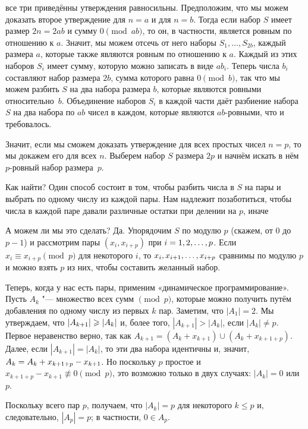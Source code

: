 \documentclass[twoside]{book}
\begin{document}
 все три приведённы утверждения равносильны.
Предположим, что мы можем доказать второе утверждение для $n = a$ и для $n = b$.
Тогда если набор $S$ имеет размер $2n = 2ab$ и сумму $0 \pmod {ab}$, то он, в частности, является ровным по отношению к $a$. 
Значит, мы можем отсечь от него наборы $S_1,\dots,S_{2b}$, каждый размера $a$, которые также являются ровным по отношению к $a$.
Каждый из этих наборов $S_i$ имеет сумму, которую можно записать в виде $ab_i$.
Теперь числа $b_i$ составляют набор размера $2b$, сумма которого равна $0 \pmod b$, так что мы можем разбить $S$ на два набора размера $b$, которые являются ровными относительно~$b$.
Объединение наборов $S_i$ в каждой части даёт разбиение набора $S$ на два набора по $ab$ чисел в каждом, которые являются $ab$-ровными,  что и требовалось.

Значит, если мы сможем доказать утверждение для всех простых чисел $n=p$, то мы докажем его для всех $n$.
Выберем набор $S$ размера $2p$ и начнём искать в нём $p$-ровный набор размера~$p$.

Как  найти?
Один способ состоит в том, чтобы разбить числа в $S$ на пары и выбрать по одному числу из каждой пары.
Нам  надлежит позаботиться, чтобы числа в каждой паре давали различные остатки при делении на $p$, иначе 

А можем ли мы это сделать?
Да.
Упорядочим $S$ по модулю $p$ (скажем, от $0$ до $p-1$) и рассмотрим пары $(x_i,x_{i+p})$ при $i\z=1,2,\dots, p$.
Если $x_i\equiv x_{i+p}\pmod p$ для некоторого $i$, то $x_i,x_{i+1},\z\dots,x_{i+p}$ сравнимы по модулю $p$ и можно взять $p$ из них, чтобы составить желанный набор.

Теперь, когда у нас есть пары, применим «динамическое программирование».
Пусть $A_k$ "--- множество всех сумм $\pmod p$, которые можно получить путём добавления по одному числу из первых $k$ пар.
Заметим, что $|A_1|= 2$.
Мы утверждаем, что $|A_{k+1}|\z\ge|A_k|$ и, более того, $|A_{k+1}|>|A_k|$, если $|A_k|\ne p$.
Первое неравенство верно, так как $A_{k+1} = (A_k+x_{k+1}) \cup (A_k+x_{k+1+p})$.
Далее, если $|A_{k+1}|=|A_k|$, то эти два набора идентичны и, значит,  $A_k \z= A_k+x_{k+1+p}-x_{k+1}$.
Но поскольку $p$ простое и $x_{k+1+p}-x_{k+1}\not\equiv 0\pmod p$, это возможно только в двух случаях: $|A_k|= 0$ или $p$.

Поскольку всего пар $p$, получаем, что $|A_k|= p$ для некоторого $k \le p$ и, следовательно, $|A_p|= p$; в частности, $0\in A_p$.
\heart
\end{document}
